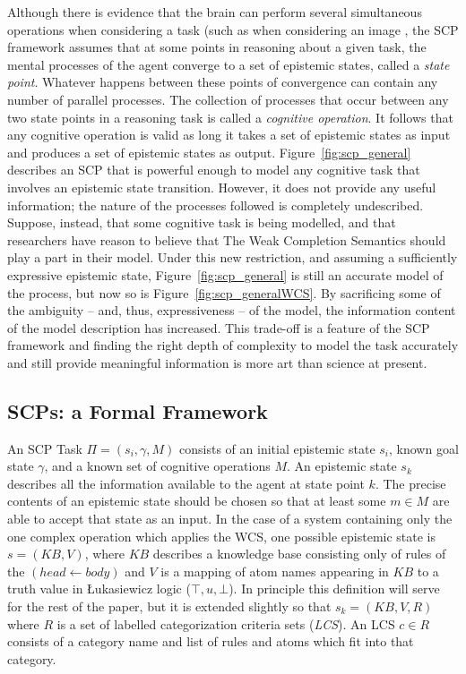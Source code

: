 \documentclass{article}
\begin{document}
Although there is evidence that the brain can perform several simultaneous operations when considering a task (such as when considering an image \citep{sigman2008brain}, the SCP framework assumes that at some points in reasoning about a given task, the mental processes of the agent converge to a set of epistemic states, called a \textit{state point}. Whatever happens between these points of convergence can contain any number of parallel processes. The collection of processes that occur between any two state points in a reasoning task is called a \textit{cognitive operation}. It follows that any cognitive operation is valid as long it takes a set of epistemic states as input and produces a set of epistemic states as output. Figure~\ref{fig:scp_general} describes an SCP that is powerful enough to model any cognitive task that involves an epistemic state transition. However, it does not provide any useful information; the nature of the processes followed is completely undescribed. Suppose, instead, that some cognitive task is being modelled, and that researchers have reason to believe that The Weak Completion Semantics should play a part in their model. Under this new restriction, and assuming a sufficiently expressive epistemic state, Figure~\ref{fig:scp_general} is still an accurate model of the process, but now so is Figure~\ref{fig:scp_generalWCS}. By sacrificing some of the ambiguity -- and, thus, expressiveness -- of the model, the information content of the model description has increased. This trade-off is a feature of the SCP framework and finding the right depth of complexity to model the task accurately and still provide meaningful information is more art than science at present. 

\subsection{SCPs: a Formal Framework}
An SCP Task $\Pi=(s_i, \gamma, M)$ consists of an initial epistemic state $s_i$, known goal state $\gamma$, and a known set of cognitive operations $M$. An epistemic state $s_k$ describes all the information available to the agent at state point $k$. The precise contents of an epistemic state should be chosen so that at least some $m \in M$ are able to accept that state as an input. In the case of a system containing only the one complex operation which applies the WCS, one possible epistemic state is $s=(KB,V)$, where $KB$ describes a knowledge base consisting only of rules of the $(head \leftarrow body)$ and $V$ is a mapping of atom names appearing in $KB$ to a truth value in \L ukasiewicz logic ($\top,u, \bot$). In principle this definition will serve for the rest of the paper, but it is extended slightly so that $s_k = (KB,V,R)$ where $R$ is a set of labelled categorization criteria sets (\textit{LCS}). An LCS $ c \in R$ consists of a category name and list of rules and atoms which fit into that category.
\end{document}
